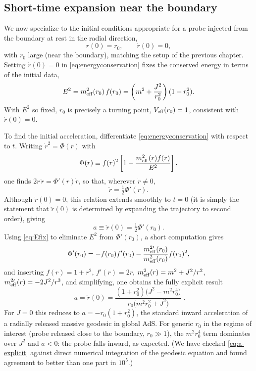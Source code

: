 \documentclass[11pt]{article}
\begin{document}
\subsection{Short-time expansion near the boundary}
\label{subsec:shorttime}

We now specialize to the initial conditions appropriate for a probe injected from the boundary at rest in the radial direction,
\begin{equation}
r(0)=r_0, \qquad \dot r(0)=0 ,
\end{equation}
with $r_0$ large (near the boundary), matching the setup of the previous chapter. Setting $\dot r(0)=0$ in \eqref{eq:energyconservation} fixes the conserved energy in terms of the initial data,
\begin{equation}
E^2 = m_{\rm eff}^2(r_0)\,f(r_0) = \left(m^2+\frac{J^2}{r_0^2}\right)(1+r_0^2) .
\label{eq:Efix}
\end{equation}
With $E^2$ so fixed, $r_0$ is precisely a turning point, $V_{\rm eff}(r_0)=1$, consistent with $\dot r(0)=0$.

To find the initial acceleration, differentiate \eqref{eq:energyconservation} with respect to $t$. Writing $\dot r^2 = \Phi(r)$ with
\begin{equation}
\Phi(r) \equiv f(r)^2\left[1-\frac{m_{\rm eff}^2(r)f(r)}{E^2}\right],
\end{equation}
one finds $2\dot r\,\ddot r = \Phi'(r)\dot r$, so that, wherever $\dot r\neq0$,
\begin{equation}
\ddot r = \tfrac12\Phi'(r) .
\end{equation}
Although $\dot r(0)=0$, this relation extends smoothly to $t=0$ (it is simply the statement that $\ddot r(0)$ is determined by expanding the trajectory to second order), giving
\begin{equation}
a \equiv \ddot r(0) = \tfrac12 \Phi'(r_0) .
\end{equation}
Using \eqref{eq:Efix} to eliminate $E^2$ from $\Phi'(r_0)$, a short computation gives
\begin{equation}
\Phi'(r_0) = -f(r_0)f'(r_0) - \frac{m_{\rm eff}^{2\prime}(r_0)}{m_{\rm eff}^2(r_0)}f(r_0)^2 ,
\end{equation}
and inserting $f(r)=1+r^2$, $f'(r)=2r$, $m_{\rm eff}^2(r)=m^2+J^2/r^2$, $m_{\rm eff}^{2\prime}(r)=-2J^2/r^3$, and simplifying, one obtains the fully explicit result
\begin{equation}
\boxed{\;
a = \ddot r(0) = \frac{(1+r_0^2)\big(J^2-m^2r_0^4\big)}{r_0\big(m^2r_0^2+J^2\big)} \; } .
\label{eq:a-explicit}
\end{equation}
For $J=0$ this reduces to $a=-r_0(1+r_0^2)$, the standard inward acceleration of a radially released massive geodesic in global AdS. For generic $r_0$ in the regime of interest (probe released close to the boundary, $r_0\gg1$), the $m^2r_0^4$ term dominates over $J^2$ and $a<0$: the probe falls inward, as expected. (We have checked \eqref{eq:a-explicit} against direct numerical integration of the geodesic equation and found agreement to better than one part in $10^5$.)
\end{document}
